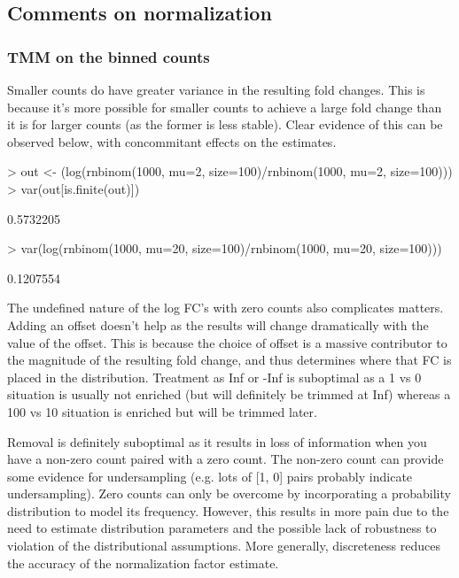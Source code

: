 \documentclass[12pt]{report}
\renewenvironment{Schunk}{\vspace{0pt}}{\vspace{0pt}}
\begin{document}
\subsection*{Comments on normalization}

\subsubsection*{TMM on the binned counts}


Smaller counts do have greater variance in the resulting fold changes.
This is because it's more possible for smaller counts to achieve a large fold change than it is for larger counts (as the former is less stable). 
Clear evidence of this can be observed below, with concommitant effects on the estimates.

\begin{Schunk}
\begin{Sinput}
> out <- (log(rnbinom(1000, mu=2, size=100)/rnbinom(1000, mu=2, size=100)))
> var(out[is.finite(out)])
\end{Sinput}
\begin{Soutput}
[1] 0.5732205
\end{Soutput}
\begin{Sinput}
> var(log(rnbinom(1000, mu=20, size=100)/rnbinom(1000, mu=20, size=100)))
\end{Sinput}
\begin{Soutput}
[1] 0.1207554
\end{Soutput}
\end{Schunk}

The undefined nature of the log FC's with zero counts also complicates matters. Adding
an offset doesn't help as the results will change dramatically with the value of the offset. 
This is because the choice of offset is a massive contributor to the magnitude of the resulting fold change, and thus determines where that FC is placed in the distribution.
Treatment as Inf or -Inf is suboptimal as a 1 vs 0 situation is usually not enriched (but will definitely be trimmed at Inf) whereas a 100 vs 10 situation is enriched but will be trimmed later. 

Removal is definitely suboptimal as it results in loss of information when you have a non-zero count paired with a zero count. 
The non-zero count can provide some evidence for undersampling (e.g. lots of [1, 0] pairs probably indicate undersampling). 
Zero counts can only be overcome by incorporating a probability distribution to model its frequency. 
However, this results in more pain due to the need to estimate distribution parameters and the possible lack of robustness to violation of the distributional assumptions.
More generally, discreteness reduces the accuracy of the normalization factor estimate.
\end{document}
